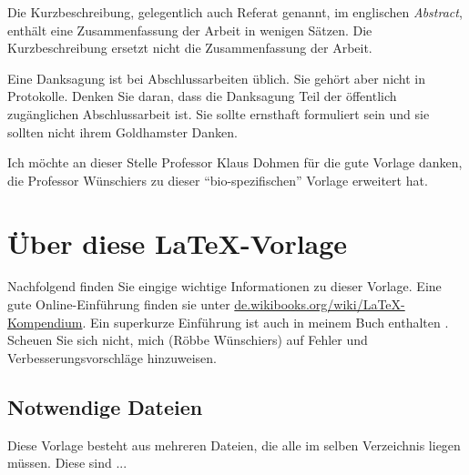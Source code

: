 \documentclass[nomenclature, norefpage, oneside, glossary, hypertext,multiauthor]{hsmw-class}
\begin{document}





\begin{Kurzbeschreibung}
Die Kurzbeschreibung, gelegentlich auch Referat genannt, im englischen \textit{Abstract}, enthält eine Zusammenfassung der Arbeit in wenigen Sätzen. Die Kurzbeschreibung ersetzt nicht die Zusammenfassung der Arbeit.
\end{Kurzbeschreibung}


\begin{Danksagung}
Eine Danksagung ist bei Abschlussarbeiten üblich. Sie gehört aber nicht in Protokolle. Denken Sie daran, dass die Danksagung Teil der öffentlich zugänglichen Abschlussarbeit ist. Sie sollte ernsthaft formuliert sein und sie sollten nicht ihrem Goldhamster Danken.

Ich möchte an dieser Stelle Professor Klaus Dohmen für die gute Vorlage danken, die Professor Wünschiers zu dieser \enquote{bio-spezifischen} Vorlage erweitert hat.
\end{Danksagung}


\Hauptteil %

\chapter{Über diese \LaTeX{}-Vorlage}
Nachfolgend finden Sie eingige wichtige Informationen zu dieser Vorlage. Eine gute Online-Einführung finden sie unter \url{de.wikibooks.org/wiki/LaTeX-Kompendium}. Ein superkurze Einführung ist auch in meinem Buch enthalten \citep{Wuenschiers2016}.
Scheuen Sie sich nicht, mich (Röbbe Wünschiers) auf Fehler und Verbesserungsvorschläge hinzuweisen.

\section{Notwendige Dateien}
Diese Vorlage besteht aus mehreren Dateien, die alle im selben Verzeichnis liegen müssen. Diese sind ...
\end{document}
